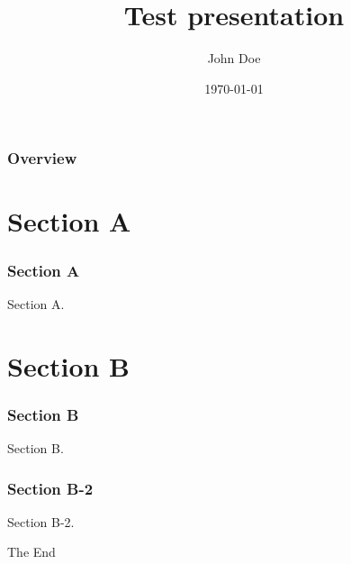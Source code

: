 \documentclass[presentation,aspectratio=1610]{beamer}
\title[Test]{Test presentation} %
\author{John Doe} %
\institute[Coventry] %
{
Coventry University \\ %
\medskip
fake@coventry.ac.uk %
}
\date{\today} %
\begin{document}
\begin{frame}
\titlepage %
\end{frame}

\begin{frame}
\frametitle{Overview} %
\tableofcontents %
\end{frame}


\section{Section A}
\begin{frame}
\frametitle{Section A}
	Section A.
\end{frame}


\section{Section B}
\begin{frame}
	\frametitle{Section B}
	Section B.
\end{frame}

\begin{frame}
	\frametitle{Section B-2}
	Section B-2.
\end{frame}


\begin{frame}
\Huge{\centerline{The End}}
\end{frame}

\end{document}
